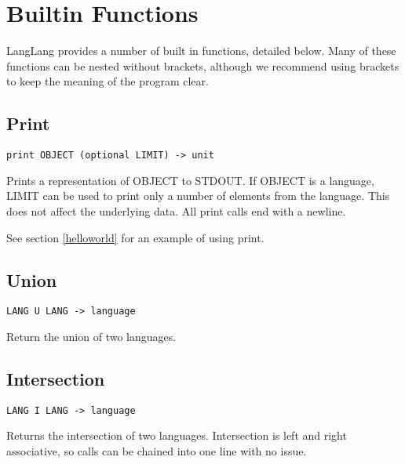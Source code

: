 \section{Builtin Functions}
\label{builtins}
\begin{normalsize}
LangLang provides a number of built in functions, detailed below. Many of these functions can be nested without brackets, although we recommend using brackets to keep the meaning of the program clear.
\end{normalsize}

\subsection{Print}
\label{print}
\begin{center}
\begin{minipage}{8cm}
\begin{verbatim}
print OBJECT (optional LIMIT) -> unit
\end{verbatim}
\end{minipage}
\end{center}
\begin{normalsize}
Prints a representation of OBJECT to STDOUT. If OBJECT is a language, LIMIT can be used to print only a number of elements from the language. This does not affect the underlying data. All print calls end with a newline.

See section \ref{helloworld} for an example of using print.
\end{normalsize}

\subsection{Union}
\begin{center}
\begin{minipage}{5cm}
\begin{verbatim}
LANG U LANG -> language
\end{verbatim}
\end{minipage}
\end{center}
\begin{normalsize}
Return the union of two languages.
\end{normalsize}

\subsection{Intersection}
\begin{center}
\begin{minipage}{5cm}
\begin{verbatim}
LANG I LANG -> language
\end{verbatim}
\end{minipage}
\end{center}
\begin{normalsize}
Returns the intersection of two languages. Intersection is left and right associative, so calls can be chained into one line with no issue.
\end{normalsize}

